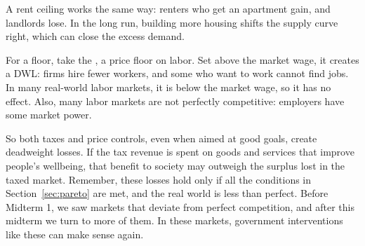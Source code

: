 \documentclass[11pt]{article}
\begin{document}
A rent ceiling works the same way: renters who get an apartment gain, and landlords lose. In the long run, building more housing shifts the supply curve right, which can close the excess demand.

For a floor, take the , a price floor on labor. Set above the market wage, it creates a DWL: firms hire fewer workers, and some who want to work cannot find jobs. In many real-world labor markets, it is below the market wage, so it has no effect. Also, many labor markets are not perfectly competitive: employers have some market power.

So both taxes and price controls, even when aimed at good goals, create deadweight losses. If the tax revenue is spent on goods and services that improve people's wellbeing, that benefit to society may outweigh the surplus lost in the taxed market. Remember, these losses hold only if all the conditions in Section~\ref{sec:pareto} are met, and the real world is less than perfect. Before Midterm 1, we saw markets that deviate from perfect competition, and after this midterm we turn to more of them. In these markets, government interventions like these can make sense again.
\end{document}
